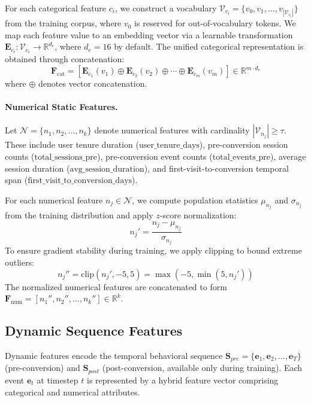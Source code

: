 For each categorical feature $c_i$, we construct a vocabulary $\mathcal{V}_{c_i} = \{v_0, v_1, \ldots, v_{|\mathcal{V}_{c_i}|}\}$ from the training corpus, where $v_0$ is reserved for out-of-vocabulary tokens. We map each feature value to an embedding vector via a learnable transformation $\mathbf{E}_{c_i}: \mathcal{V}_{c_i} \rightarrow \mathbb{R}^{d_e}$, where $d_e = 16$ by default. The unified categorical representation is obtained through concatenation:
\begin{equation}
\mathbf{F}_{\text{cat}} = [\mathbf{E}_{c_1}(v_1) \oplus \mathbf{E}_{c_2}(v_2) \oplus \cdots \oplus \mathbf{E}_{c_m}(v_m)] \in \mathbb{R}^{m \cdot d_e}
\end{equation}
where $\oplus$ denotes vector concatenation.

\paragraph{Numerical Static Features.}
Let $\mathcal{N} = \{n_1, n_2, \ldots, n_k\}$ denote numerical features with cardinality $|\mathcal{V}_{n_j}| \geq \tau$. These include user tenure duration ($\text{user\_tenure\_days}$), pre-conversion session counts ($\text{total\_sessions\_pre}$), pre-conversion event counts ($\text{total\_events\_pre}$), average session duration ($\text{avg\_session\_duration}$), and first-visit-to-conversion temporal span ($\text{first\_visit\_to\_conversion\_days}$).

For each numerical feature $n_j \in \mathcal{N}$, we compute population statistics $\mu_{n_j}$ and $\sigma_{n_j}$ from the training distribution and apply $z$-score normalization:
\begin{equation}
n_j' = \frac{n_j - \mu_{n_j}}{\sigma_{n_j}}
\end{equation}
To ensure gradient stability during training, we apply clipping to bound extreme outliers:
\begin{equation}
n_j'' = \text{clip}(n_j', -5, 5) = \max(-5, \min(5, n_j'))
\end{equation}
The normalized numerical features are concatenated to form $\mathbf{F}_{\text{num}} = [n_1'', n_2'', \ldots, n_k''] \in \mathbb{R}^k$.

\subsection{Dynamic Sequence Features}
\label{app:dynamic_features}

Dynamic features encode the temporal behavioral sequence $\mathbf{S}_{pre} = \{\mathbf{e}_1, \mathbf{e}_2, \ldots, \mathbf{e}_T\}$ (pre-conversion) and $\mathbf{S}_{post}$ (post-conversion, available only during training). Each event $\mathbf{e}_t$ at timestep $t$ is represented by a hybrid feature vector comprising categorical and numerical attributes.

